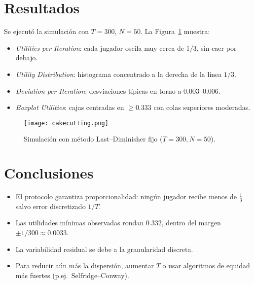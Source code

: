 \documentclass[11pt,a4paper]{article}
\begin{document}
\section{Resultados}
Se ejecutó la simulación con \(T=300\), \(N=50\).  
La Figura~\ref{fig:resultados} muestra:
\begin{itemize}
  \item \emph{Utilities per Iteration}: cada jugador oscila
        muy cerca de \(1/3\), sin caer por debajo.
  \item \emph{Utility Distribution}: histograma concentrado
        a la derecha de la línea \(1/3\).
  \item \emph{Deviation per Iteration}: desviaciones típicas
        en torno a \(0.003\)–\(0.006\).
  \item \emph{Boxplot Utilities}: cajas centradas en \(\ge0.333\)
        con colas superiores moderadas.
\end{itemize}

\begin{figure}[ht]
  \centering
  \texttt{[image: cakecutting.png]}
  \caption{Simulación con método Last–Diminisher fijo (\(T=300,N=50\)).}
  \label{fig:resultados}
\end{figure}

\section{Conclusiones}
\begin{itemize}
  \item El protocolo garantiza proporcionalidad: ningún jugador
        recibe menos de \(\tfrac13\) salvo error discretizado \(1/T\).
  \item Las utilidades mínimas observadas rondan \(0.332\), dentro
        del margen \(\pm1/300\approx0.0033\).
  \item La variabilidad residual se debe a la granularidad discreta.
  \item Para reducir aún más la dispersión, aumentar \(T\) o usar
        algoritmos de equidad más fuertes (p.ej.\ Selfridge–Conway).
\end{itemize}
\end{document}

